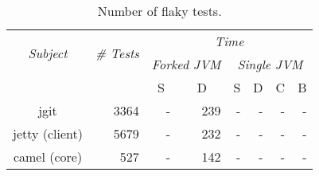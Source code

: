 \begin{table*}[t]
  \centering
  \begin{tabular}{|c|r|r|r|r|r|r|r|}
    \hline
    \multirow{2}{*}{\emph{Subject}} & \multirow{2}{*}{\emph{\# Tests}} &  \multicolumn{6}{c|}{\emph{Time}}\\
    \cline{3-8}
    & & \multicolumn{2}{c|}{\emph{Forked JVM}} & \multicolumn{4}{c|}{\emph{Single JVM}}   \\
    \cline{3-8}
    & & \multicolumn{1}{c|}{S} & \multicolumn{1}{c|}{D} & \multicolumn{1}{c|}{S} & \multicolumn{1}{c|}{D} & \multicolumn{1}{c|}{C} & \multicolumn{1}{c|}{B}\\     \hline
    jgit & 3364 & - & 239 & -  & - & -  & - \\
    \hline
    jetty (client) & 5679 & - & 232  & -  & - & - & - \\
    \hline
    camel (core) & 527 & - & 142 & - & - & - & -\\
    \hline
  \end{tabular}
  \caption{\label{table:failures}Number of flaky tests.}
\end{table*}

